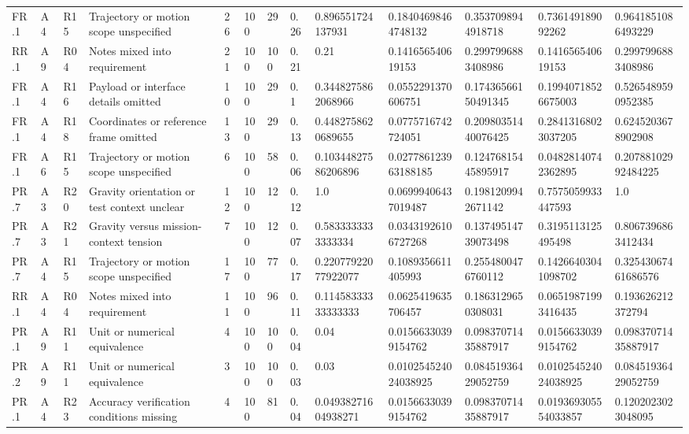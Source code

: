 \begin{tabular}{lllllllllllll}
FR.1 & A4 & R15 & Trajectory or motion scope unspecified & 26 & 100 & 29 & 0.26 & 0.896551724137931 & 0.18404698464748132 & 0.3537098944918718 & 0.736149189092262 & 0.9641851086493229 \\
RR.1 & A9 & R04 & Notes mixed into requirement & 21 & 100 & 100 & 0.21 & 0.21 & 0.141656540619153 & 0.2997996883408986 & 0.141656540619153 & 0.2997996883408986 \\
FR.1 & A4 & R16 & Payload or interface details omitted & 10 & 100 & 29 & 0.1 & 0.3448275862068966 & 0.0552291370606751 & 0.17436566150491345 & 0.19940718526675003 & 0.5265489590952385 \\
FR.1 & A4 & R18 & Coordinates or reference frame omitted & 13 & 100 & 29 & 0.13 & 0.4482758620689655 & 0.0775716742724051 & 0.20980351440076425 & 0.28413168023037205 & 0.6245203678902908 \\
FR.1 & A6 & R15 & Trajectory or motion scope unspecified & 6 & 100 & 58 & 0.06 & 0.10344827586206896 & 0.027786123963188185 & 0.12476815445895917 & 0.04828140742362895 & 0.20788102992484225 \\
PR.7 & A3 & R20 & Gravity orientation or test context unclear & 12 & 100 & 12 & 0.12 & 1.0 & 0.06999406437019487 & 0.1981209942671142 & 0.7575059933447593 & 1.0 \\
PR.7 & A3 & R21 & Gravity versus mission-context tension & 7 & 100 & 12 & 0.07 & 0.5833333333333334 & 0.03431926106727268 & 0.13749514739073498 & 0.3195113125495498 & 0.8067396863412434 \\
PR.7 & A4 & R15 & Trajectory or motion scope unspecified & 17 & 100 & 77 & 0.17 & 0.22077922077922077 & 0.1089356611405993 & 0.2554800476760112 & 0.14266403041098702 & 0.32543067461686576 \\
RR.1 & A4 & R04 & Notes mixed into requirement & 11 & 100 & 96 & 0.11 & 0.11458333333333333 & 0.0625419635706457 & 0.1863129650308031 & 0.06519871993416435 & 0.193626212372794 \\
PR.1 & A9 & R11 & Unit or numerical equivalence & 4 & 100 & 100 & 0.04 & 0.04 & 0.01566330399154762 & 0.09837071435887917 & 0.01566330399154762 & 0.09837071435887917 \\
PR.2 & A9 & R11 & Unit or numerical equivalence & 3 & 100 & 100 & 0.03 & 0.03 & 0.010254524024038925 & 0.08451936429052759 & 0.010254524024038925 & 0.08451936429052759 \\
PR.1 & A4 & R23 & Accuracy verification conditions missing & 4 & 100 & 81 & 0.04 & 0.04938271604938271 & 0.01566330399154762 & 0.09837071435887917 & 0.019369305554033857 & 0.1202023023048095 \\

\end{tabular}
